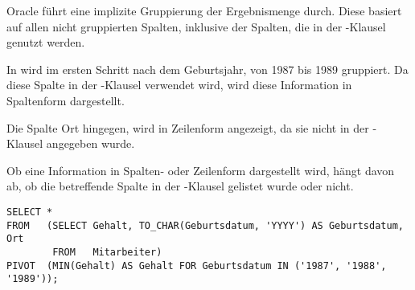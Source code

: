 \begin{merke}
    Oracle führt eine implizite Gruppierung der Ergebnismenge durch. Diese basiert auf allen nicht gruppierten Spalten, inklusive der Spalten, die in der -Klausel genutzt werden.
\end{merke}
In  wird im ersten Schritt nach dem Geburtsjahr, von 1987 bis 1989 gruppiert. Da diese Spalte in der -Klausel verwendet wird, wird diese Information in Spaltenform dargestellt.

Die Spalte Ort hingegen, wird in Zeilenform angezeigt, da sie nicht in der -Klausel angegeben wurde.

\begin{merke}
    Ob eine Information in Spalten- oder Zeilenform dargestellt wird, hängt davon ab, ob die betreffende Spalte in der -Klausel gelistet wurde oder nicht.
\end{merke}
\begin{lstlisting}[language=oracle_sql,caption={Zusätzliche Gruppierungen in einer Pivot-Abfrage},label=sql06_21]
SELECT *
FROM   (SELECT Gehalt, TO_CHAR(Geburtsdatum, 'YYYY') AS Geburtsdatum, Ort
        FROM   Mitarbeiter)
PIVOT  (MIN(Gehalt) AS Gehalt FOR Geburtsdatum IN ('1987', '1988', '1989'));
          \end{lstlisting}
\clearpage
